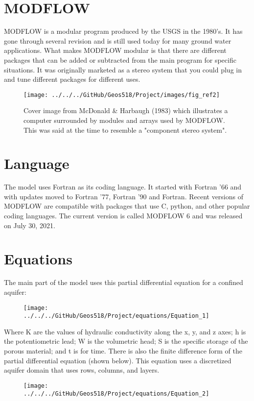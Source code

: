 \documentclass[]{report}
\begin{document}
\section{MODFLOW} 
MODFLOW is a modular program produced by the USGS in the 1980’s. It has gone through several revision and is still used today for many ground water applications. What makes MODFLOW modular is that there are different packages that can be added or subtracted from the main program for specific situations. It was originally marketed as a stereo system that you could plug in and tune different packages for different uses.

\begin{figure}[h]
	
	\centering
	\texttt{[image: ../../../GitHub/Geos518/Project/images/fig\_ref2]}
	\caption{Cover image from McDonald \& Harbaugh (1983) which illustrates a computer surrounded by modules and arrays used by MODFLOW. This was said at the time to resemble a "component stereo system".}
	\label{Fig:1}
\end{figure}

\section{Language}
The model uses Fortran as its coding language. It started with Fortran ’66 and with updates moved to Fortran ’77, Fortran ’90 and Fortran. Recent versions of MODFLOW are compatible with packages that use C, python, and other popular coding languages. The current version is called MODFLOW 6 and was released on July 30, 2021.

\section{Equations}
The main part of the model uses this partial differential equation for a confined aquifer:
\begin{figure}[h]
	\centering
	\texttt{[image: ../../../GitHub/Geos518/Project/equations/Equation\_1]}
\end{figure}
Where K are the values of hydraulic conductivity along the x, y, and z axes; h is the potentiometric lead; W is the volumetric head; S is the specific storage of the porous material; and t is for time.
There is also the finite difference form of the partial differential equation (shown below). This equation uses a discretized aquifer domain that uses rows, columns, and layers.
\begin{figure}[h]
	\centering
	\texttt{[image: ../../../GitHub/Geos518/Project/equations/Equation\_2]}	
\end{figure}\\
\end{document}
